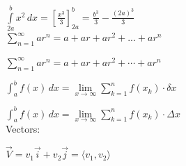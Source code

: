 \documentclass[11pt]{article}
\begin{document}
$\displaystyle{\int \limits_{2a}^{b}x^2 \, dx = \left[\frac{x^3}{3}\right]_{2a}^{b}  = \frac{b^3}{3}-\frac{(2a)^3}{3}}$ \\

$\displaystyle{\sum\limits_{n = 1}^{\infty}ar^n = a+ar+ar^2+...+ar^n}$

$\displaystyle{\sum\limits_{n = 1}^{\infty}ar^n = a+ar+ar^2+ \cdots +ar^n}$

$\displaystyle{\int_a^b f(x) \, dx =  \lim \limits_{x \to \infty} \sum \limits_{k = 1}^n f(x_k) \cdot \delta x}$


$\displaystyle{\int_a^b f(x) \, dx =  \lim \limits_{x \to \infty} \sum \limits_{k = 1}^n f(x_k) \cdot \Delta x}$ \\

Vectors:

$\vec{V} = v_1 \vec{i} + v_2 \vec{j} = \langle v_1, v_2 \rangle$
\end{document}
